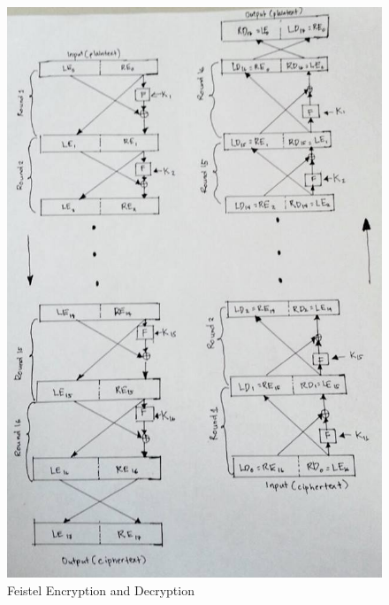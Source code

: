 \documentclass{article}
\begin{document}
\begin{figure}[h]
\begin{center}
\includegraphics[scale=.3]{FeistelEncryptDecrypt2.png}
\caption{Feistel Encryption and Decryption}
\label{FeistelEncryptDecrypt}
\end{center}
\end{figure}
\end{document}
